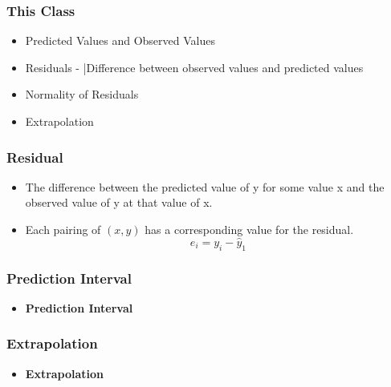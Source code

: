 \begin{frame}
\frametitle{This Class}
\begin{itemize}
\item Predicted Values and Observed Values
\item Residuals - |Difference between observed values and predicted values
\item Normality of Residuals
\item Extrapolation
\end{itemize}
\end{frame}
\begin{frame}
\frametitle{Residual}
\begin{itemize}
\item The difference between the predicted value of y for some value x and the observed value of y at that value of x.
\item Each pairing of $(x,y)$  has a corresponding value for the residual.
\[ e_i = y_i - \hat{y}_1 \]
\end{itemize}
\end{frame}

\begin{frame}
\frametitle{Prediction Interval}

\begin{itemize}
\item \textbf{Prediction Interval}
\end{itemize}
\end{frame}

\begin{frame}
\frametitle{Extrapolation}

\begin{itemize}
\item \textbf{Extrapolation}
\end{itemize}
\end{frame}

